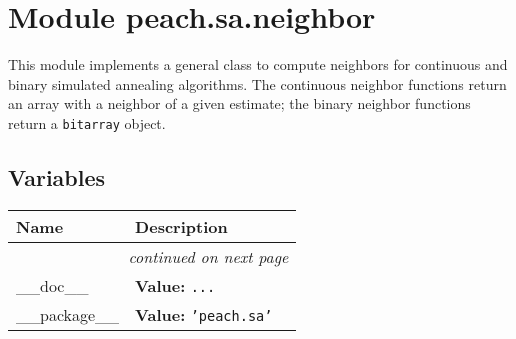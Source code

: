 %
%
%


\section{Module peach.sa.neighbor}

    \label{peach:sa:neighbor}

This module implements a general class to compute neighbors for continuous and
binary simulated annealing algorithms. The continuous neighbor functions return
an array with a neighbor of a given estimate; the binary neighbor functions
return a \texttt{bitarray} object.


  \subsection{Variables}

    \vspace{-1cm}
\hspace{\varindent}\begin{longtable}{|p{\varnamewidth}|p{\vardescrwidth}|l}
\cline{1-2}
\cline{1-2} \centering \textbf{Name} & \centering \textbf{Description}& \\
\cline{1-2}
\endhead\cline{1-2}\multicolumn{3}{r}{\small\textit{continued on next page}}\\\endfoot\cline{1-2}
\endlastfoot\raggedright \_\-\_\-d\-o\-c\-\_\-\_\- & \raggedright \textbf{Value:} 
{\tt \texttt{...}}&\\
\cline{1-2}
\raggedright \_\-\_\-p\-a\-c\-k\-a\-g\-e\-\_\-\_\- & \raggedright \textbf{Value:} 
{\tt \texttt{'}\texttt{peach.sa}\texttt{'}}&\\
\cline{1-2}
\end{longtable}


